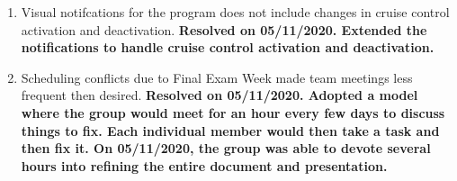 \documentclass[preprint,11pt,3p]{article}
\begin{document}
\begin{enumerate}
	\item Visual notifcations for the program does not include changes in cruise control activation and deactivation. \textbf{Resolved on 05/11/2020. Extended the notifications to handle cruise control activation and deactivation.}
	\item Scheduling conflicts due to Final Exam Week made team meetings less frequent then desired. \textbf{Resolved on 05/11/2020. Adopted a model where the group would meet for an hour every few days to discuss things to fix. Each individual member would then take a task and then fix it. On 05/11/2020, the group was able to devote several hours into refining the entire document and presentation.}



\end{enumerate}
\end{document}
